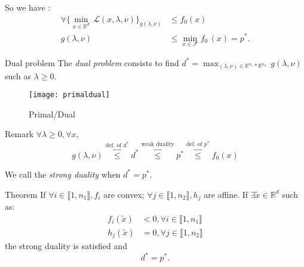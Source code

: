 \documentclass[unknownkeysallowed]{beamer}
\begin{document}
 \begin{frame}
\begin{block}{}
So we have :
\begin{align*}
\forall
\{ \min_{x \in \mathbb{R}^d} \, \mathcal{L}(x,\lambda,\nu )\}_{g(\lambda,\nu)} & \leq f_0(x) \\
g(\lambda,\nu) & \leq \min_{x \in \mathcal{F}} f_0\,(x) = p^{*}.
\end{align*}
\end{block}
\begin{block}{Dual problem}
The \textit{dual problem} consists to find $d^{*} =\displaystyle  \max_{(\lambda,\nu) \in \mathbb{R}^{n_{1}} * \mathbb{R}^{n_{2}}} \, g(\lambda,\nu)$ such as $\lambda \geq 0$.
\end{block}

\end{frame}
\begin{frame}
\begin{figure}[!h]
    \begin{center}
   \caption{\label{étiquette} Primal/Dual}
   \texttt{[image: primaldual]}
   \end{center}
    \end{figure}
\end{frame}
\begin{frame}
     \begin{block}{Remark}
        $\forall \lambda \geq 0, \forall x $,
        $$
        g(\lambda, \nu) \overbrace{\leq}^{\text{def. of }d^*} d^* \overbrace{\leq}^{\text{weak duality}} p^* \overbrace{\leq}^{\text{def. of } p^*} f_0(x)
        $$

        We call the \textit{strong duality} when $d^*=p^*$.
     \end{block}

     \begin{alertblock}{Theorem}
        If $\forall i \in \llbracket 1,n_1 \rrbracket, f_i$ are convex; $\forall j \in \llbracket 1,n_2 \rrbracket, h_j$ are affine. If $\exists \tilde x \in \mathbb{R}^d$ such as:
        \begin{align*}
            f_i(\tilde x) &< 0, \forall i \in \llbracket 1,n_1 \rrbracket   \\
            h_j(\tilde x) &= 0, \forall j \in \llbracket 1,n_2 \rrbracket
        \end{align*}
        the strong duality is satisfied and
        $$
        d^* = p^*.
        $$
     \end{alertblock}
\end{frame}
\end{document}
